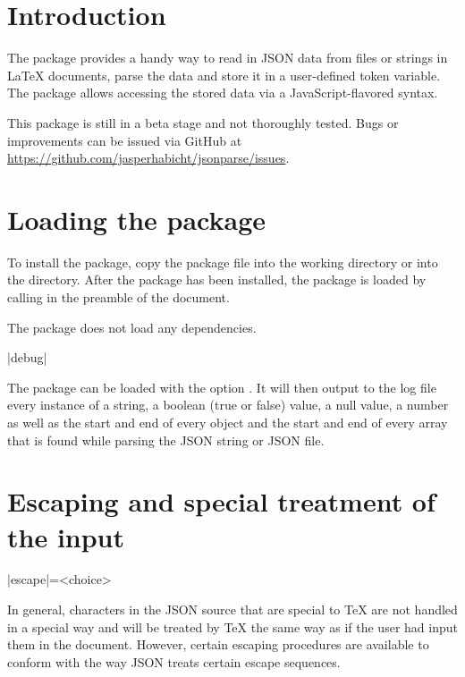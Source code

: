 \documentclass[a4paper]{article}
\begin{document}
\printdoctitle

\bigskip

\section{Introduction}

The  package provides a handy way to read in JSON data from files or strings in LaTeX documents, parse the data and store it in a user-defined token variable. The package allows accessing the stored data via a JavaScript-flavored syntax.

This package is still in a beta stage and not thoroughly tested. Bugs or improvements can be issued via GitHub at \url{https://github.com/jasperhabicht/jsonparse/issues}.

\section{Loading the package}

To install the package, copy the package file  into the working directory or into the  directory. After the package has been installed, the  package is loaded by calling \macro{\usepackage{jsonparse}} in the preamble of the document. 

The package does not load any dependencies.

\begin{macrodef}
|debug|
\end{macrodef}
The package can be loaded with the option . It will then output to the log file every instance of a string, a boolean (true or false) value, a null value, a number as well as the start and end of every object and the start and end of every array that is found while parsing the JSON string or JSON file.

\section{Escaping and special treatment of the input}\label{sec:escaping}

\begin{macrodef}
|escape|={<choice>}
\end{macrodef}

In general, characters in the JSON source that are special to TeX are not handled in a special way and will be treated by TeX the same way as if the user had input them in the document. However, certain escaping procedures are available to conform with the way JSON treats certain escape sequences.
\end{document}
